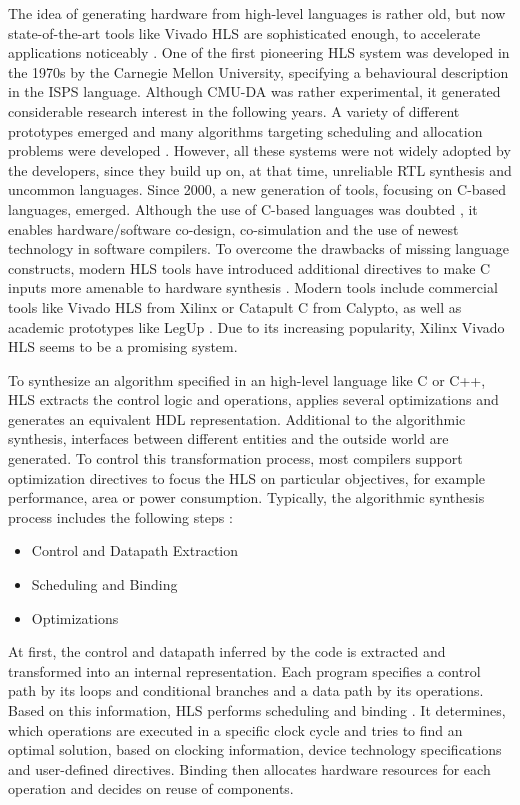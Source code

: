 The idea of generating hardware from high-level languages is rather old, but
now state-of-the-art tools like Vivado HLS are sophisticated enough, to
accelerate applications noticeably \citep{EcEc08,XSA10}. One of the first
pioneering \ac{HLS} system was developed in the 1970s \citep{DPS81} by the
Carnegie Mellon University, specifying a behavioural description in the
\ac{ISPS} language. Although \ac{CMU-DA} was rather experimental, it generated
considerable research interest in the following years. A variety of different
prototypes emerged and many algorithms targeting scheduling and allocation
problems were developed \citep{CBN11}. However, all these systems were not
widely adopted by the developers, since they build up on, at that time,
unreliable \ac{RTL} synthesis and uncommon languages. Since 2000, a new
generation of tools, focusing on C-based languages, emerged. Although the use
of C-based languages was doubted \citep{Edw06}, it enables hardware/software
co-design, co-simulation and the use of newest technology in software
compilers. To overcome the drawbacks of missing language constructs, modern
\ac{HLS} tools have introduced additional directives to make C inputs more
amenable to hardware synthesis \citep{CBN11}. Modern tools include commercial
tools like Vivado HLS from Xilinx or Catapult C from Calypto, as well as
academic prototypes like LegUp \citep{CCA11}. Due to its increasing
popularity, Xilinx Vivado HLS seems to be a promising system.

To synthesize an algorithm specified in an high-level language like C or C++,
\ac{HLS} extracts the control logic and operations, applies several
optimizations and generates an equivalent \ac{HDL} representation. Additional
to the algorithmic synthesis, interfaces between different entities and the
outside world are generated. To control this transformation process, most
compilers support optimization directives to focus the \ac{HLS} on particular
objectives, for example performance, area or power consumption. Typically, the
algorithmic synthesis process includes the following steps \citep{OCC14}:
\begin{itemize} 
\item Control and Datapath Extraction
\item Scheduling and Binding
\item Optimizations
\end{itemize}
At first, the control and datapath inferred by the code is extracted and
transformed into an internal representation. Each program specifies a control
path by its loops and conditional branches and a data path by its operations.
Based on this information, \ac{HLS} performs scheduling and binding
\citep{OCC14}. It determines, which operations are executed in a specific
clock cycle and tries to find an optimal solution, based on clocking
information, device technology specifications and user-defined directives.
Binding then allocates hardware resources for each operation and decides on
reuse of components.


